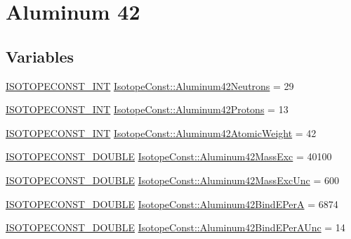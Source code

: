 \hypertarget{group___isotope_const-_aluminum-_al42}{}\section{Aluminum 42}
\label{group___isotope_const-_aluminum-_al42}
\subsection*{Variables}
\begin{DoxyCompactItemize}
\item 
\mbox{\hyperlink{group___isotope_const-_macros_ga5f18360b3e99483a35c32d789e62621c}{I\+S\+O\+T\+O\+P\+E\+C\+O\+N\+S\+T\+\_\+\+I\+NT}} \mbox{\hyperlink{group___isotope_const-_aluminum-_al42_ga19bab0916a0e4aa87b06c4b292fffdd7}{Isotope\+Const\+::\+Aluminum42\+Neutrons}} = 29
\item 
\mbox{\hyperlink{group___isotope_const-_macros_ga5f18360b3e99483a35c32d789e62621c}{I\+S\+O\+T\+O\+P\+E\+C\+O\+N\+S\+T\+\_\+\+I\+NT}} \mbox{\hyperlink{group___isotope_const-_aluminum-_al42_ga4abc71b8df73ca7f1b5c582b3d242ed6}{Isotope\+Const\+::\+Aluminum42\+Protons}} = 13
\item 
\mbox{\hyperlink{group___isotope_const-_macros_ga5f18360b3e99483a35c32d789e62621c}{I\+S\+O\+T\+O\+P\+E\+C\+O\+N\+S\+T\+\_\+\+I\+NT}} \mbox{\hyperlink{group___isotope_const-_aluminum-_al42_ga028bbda3e49da1268101a1e5c267fa58}{Isotope\+Const\+::\+Aluminum42\+Atomic\+Weight}} = 42
\item 
\mbox{\hyperlink{group___isotope_const-_macros_ga8f45a7272ce02c0b4c65c44636ed719a}{I\+S\+O\+T\+O\+P\+E\+C\+O\+N\+S\+T\+\_\+\+D\+O\+U\+B\+LE}} \mbox{\hyperlink{group___isotope_const-_aluminum-_al42_gae91ab27a80f7108a70efd51780e551be}{Isotope\+Const\+::\+Aluminum42\+Mass\+Exc}} = 40100
\item 
\mbox{\hyperlink{group___isotope_const-_macros_ga8f45a7272ce02c0b4c65c44636ed719a}{I\+S\+O\+T\+O\+P\+E\+C\+O\+N\+S\+T\+\_\+\+D\+O\+U\+B\+LE}} \mbox{\hyperlink{group___isotope_const-_aluminum-_al42_ga07cc6a15936a17283003f123e115b57e}{Isotope\+Const\+::\+Aluminum42\+Mass\+Exc\+Unc}} = 600
\item 
\mbox{\hyperlink{group___isotope_const-_macros_ga8f45a7272ce02c0b4c65c44636ed719a}{I\+S\+O\+T\+O\+P\+E\+C\+O\+N\+S\+T\+\_\+\+D\+O\+U\+B\+LE}} \mbox{\hyperlink{group___isotope_const-_aluminum-_al42_ga9ca4a5ed20307a3a448471428a26fa66}{Isotope\+Const\+::\+Aluminum42\+Bind\+E\+PerA}} = 6874
\item 
\mbox{\hyperlink{group___isotope_const-_macros_ga8f45a7272ce02c0b4c65c44636ed719a}{I\+S\+O\+T\+O\+P\+E\+C\+O\+N\+S\+T\+\_\+\+D\+O\+U\+B\+LE}} \mbox{\hyperlink{group___isotope_const-_aluminum-_al42_ga88a41bf3f839fdc710892f66e89f7063}{Isotope\+Const\+::\+Aluminum42\+Bind\+E\+Per\+A\+Unc}} = 14

\end{DoxyCompactItemize}
